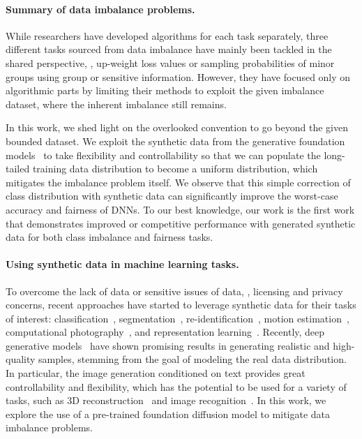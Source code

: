 \paragraph{Summary of data imbalance problems.}
While researchers have developed algorithms for each task separately, three different tasks sourced from data imbalance have mainly been tackled in the shared perspective, \ie, 
up-weight loss values or sampling probabilities of minor groups using group or sensitive information.
However, they have focused only on algorithmic parts by limiting their methods to exploit the given imbalance dataset, where the inherent imbalance still remains.

In this work, we shed light on the overlooked convention to go beyond the given bounded dataset.
We exploit the synthetic data from the generative foundation models~\cite{rombach2022high, saharia2022photorealistic, nichol2021glide} to take flexibility and controllability so that we can populate the long-tailed training data distribution to become a uniform distribution, which mitigates the imbalance problem itself.
We observe that this simple correction of class distribution with synthetic data can significantly improve the worst-case accuracy and fairness of DNNs.
To our best knowledge, our work is the first work that demonstrates improved or competitive performance with generated synthetic data for both class imbalance and fairness tasks.

\paragraph{Using synthetic data in machine learning tasks.}
To overcome the lack of data or sensitive issues of data, \eg, licensing and privacy concerns, recent approaches have started to leverage synthetic data for their tasks of interest:
classification~\cite{antoniou2017data, tran2017bayesian}, segmentation~\cite{sandfort2019data, zhang2021datasetgan}, re-identification~\cite{zheng2017unlabeled}, motion estimation~\cite{dosovitskiy2015flownet, mayer2016large, sun2021autoflow, han2022realflow, oh2018learning}, computational photography~\cite{pan2021dual}, and representation learning~\cite{jahanian2021generative}.
Recently, deep generative models~\cite{rombach2022high, saharia2022photorealistic, nichol2021glide} have shown promising results in generating realistic and high-quality samples, stemming from the goal of modeling the real data distribution.
In particular, the image generation conditioned on text provides great controllability and flexibility, which has the potential to be used for a variety of tasks, such as 3D reconstruction~\cite{poole2023dreamfusion, raj2023dreambooth3d, chen2023fantasia3d} and image recognition~\cite{trabucco2023effective, he2022synthetic, azizi2023synthetic}.
In this work, we explore the use of a pre-trained foundation diffusion model to mitigate data imbalance problems.



